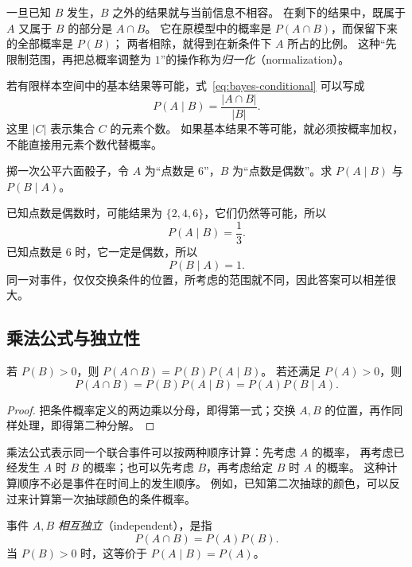 \documentclass[UTF8,12pt,a4paper,fontset=fandol]{ctexart}
\begin{document}
一旦已知 $B$ 发生，$B$ 之外的结果就与当前信息不相容。
在剩下的结果中，既属于 $A$ 又属于 $B$ 的部分是 $A\cap B$。
它在原模型中的概率是 $P(A\cap B)$，而保留下来的全部概率是 $P(B)$；
两者相除，就得到在新条件下 $A$ 所占的比例。
这种“先限制范围，再把总概率调整为 $1$”的操作称为\emph{归一化}（normalization）。

若有限样本空间中的基本结果等可能，式~\eqref{eq:bayes-conditional} 可以写成
\[
  P(A\mid B)=\frac{|A\cap B|}{|B|}.
\]
这里 $|C|$ 表示集合 $C$ 的元素个数。
如果基本结果不等可能，就必须按概率加权，不能直接用元素个数代替概率。

\begin{example}[两个方向的条件概率]
\label{ex:bayes-die}
掷一次公平六面骰子，令 $A$ 为“点数是 $6$”，$B$ 为“点数是偶数”。求 $P(A\mid B)$ 与 $P(B\mid A)$。
\end{example}
\begin{solve}
已知点数是偶数时，可能结果为 $\{2,4,6\}$，它们仍然等可能，所以
\[
  P(A\mid B)=\frac13.
\]
已知点数是 $6$ 时，它一定是偶数，所以
\[
  P(B\mid A)=1.
\]
同一对事件，仅仅交换条件的位置，所考虑的范围就不同，因此答案可以相差很大。
\end{solve}

\subsection{乘法公式与独立性}

\begin{proposition}[两个事件的乘法公式]
\label{prop:bayes-product}
若 $P(B)>0$，则 $P(A\cap B)=P(B)P(A\mid B)$。
若还满足 $P(A)>0$，则
\begin{equation}
  P(A\cap B)=P(B)P(A\mid B)=P(A)P(B\mid A).
  \label{eq:bayes-product}
\end{equation}
\end{proposition}
\begin{proof}
把条件概率定义的两边乘以分母，即得第一式；交换 $A,B$ 的位置，再作同样处理，即得第二种分解。
\end{proof}

乘法公式表示同一个联合事件可以按两种顺序计算：先考虑 $A$ 的概率，
再考虑已经发生 $A$ 时 $B$ 的概率；也可以先考虑 $B$，再考虑给定 $B$ 时 $A$ 的概率。
这种计算顺序不必是事件在时间上的发生顺序。
例如，已知第二次抽球的颜色，可以反过来计算第一次抽球颜色的条件概率。

\begin{definition}[事件的独立性]
事件 $A,B$ \emph{相互独立}（independent），是指
\[
  P(A\cap B)=P(A)P(B).
\]
当 $P(B)>0$ 时，这等价于 $P(A\mid B)=P(A)$。
\end{definition}
\end{document}
